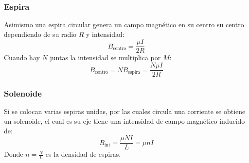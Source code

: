 \documentclass[arial,a4paper,print]{article}
\begin{document}
\subsubsection{Espira}
Asimismo una espira circular genera un campo magnético en su centro su centro dependiendo de su radio $R$ y intensidad:
\begin{equation*}
	B_{\text{centro}} = \frac{\mu I}{2R}
\end{equation*}
Cuando hay $N$ juntas la intensidad se multiplica por $M$:
\begin{equation*}
	B_{\text{centro}} = NB_{\text{espira}} = \frac{N\mu I}{2R}
\end{equation*}

\subsubsection{Solenoide}
Si se colocan varias espiras unidas, por las cuales circula una corriente se obtiene un solenoide, el cual es su eje tiene una intensidad de campo magnético inducido de:
\begin{equation*}
	B_{\text{int}} = \frac{\mu NI}{L} = \mu nI
\end{equation*}
Donde $n=\frac{N}{L}$ es la densidad de espiras. 
\end{document}
